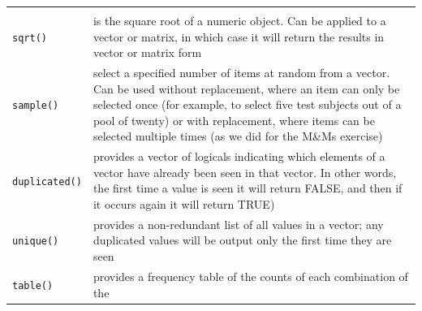 \documentclass[a4paper]{book}
\begin{document}
\begin{longtable}[]{@{}ll@{}}
\begin{minipage}[t]{0.80\columnwidth}
\end{minipage}\tabularnewline
\begin{minipage}[t]{0.14\columnwidth}\raggedright\strut
\texttt{sqrt()}\strut
\end{minipage} & \begin{minipage}[t]{0.80\columnwidth}\raggedright\strut
is the square root of a numeric object. Can be applied to a vector or
matrix, in which case it will return the results in vector or matrix
form\strut
\end{minipage}\tabularnewline
\begin{minipage}[t]{0.14\columnwidth}\raggedright\strut
\texttt{sample()}\strut
\end{minipage} & \begin{minipage}[t]{0.80\columnwidth}\raggedright\strut
select a specified number of items at random from a vector. Can be used
without replacement, where an item can only be selected once (for
example, to select five test subjects out of a pool of twenty) or with
replacement, where items can be selected multiple times (as we did for
the M\&Ms exercise)\strut
\end{minipage}\tabularnewline
\begin{minipage}[t]{0.14\columnwidth}\raggedright\strut
\texttt{duplicated()}\strut
\end{minipage} & \begin{minipage}[t]{0.80\columnwidth}\raggedright\strut
provides a vector of logicals indicating which elements of a vector have
already been seen in that vector. In other words, the first time a value
is seen it will return FALSE, and then if it occurs again it will return
TRUE)\strut
\end{minipage}\tabularnewline
\begin{minipage}[t]{0.14\columnwidth}\raggedright\strut
\texttt{unique()}\strut
\end{minipage} & \begin{minipage}[t]{0.80\columnwidth}\raggedright\strut
provides a non-redundant list of all values in a vector; any duplicated
values will be output only the first time they are seen\strut
\end{minipage}\tabularnewline
\begin{minipage}[t]{0.14\columnwidth}\raggedright\strut
\texttt{table()}\strut
\end{minipage} & \begin{minipage}[t]{0.80\columnwidth}\raggedright\strut
provides a frequency table of the counts of each combination of
the\strut
\end{minipage}\tabularnewline
\bottomrule
\end{longtable}
\end{document}

